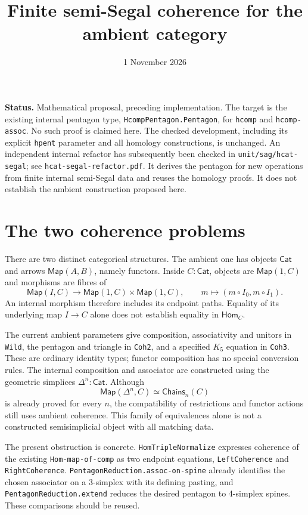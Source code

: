 \documentclass[11pt]{amsart}
\title{Finite semi-Segal coherence for the ambient category}
\date{1 November 2026}
\newcommand{\Cat}{\mathsf{Cat}}
\newcommand{\Map}{\mathsf{Map}}
\newcommand{\Hom}{\mathsf{Hom}}
\newcommand{\code}[1]{\nolinkurl{#1}}
\theoremstyle{definition}
\begin{document}
\maketitle

\noindent
\textbf{Status.} Mathematical proposal, preceding implementation.
The target is the existing internal pentagon type,
\code{HcompPentagon.Pentagon}, for \code{hcomp} and
\code{hcomp-assoc}. No such proof is claimed here.
The checked development, including its explicit \code{hpent} parameter
and all homology constructions, is unchanged.
An independent internal refactor has subsequently been checked in
\code{unit/sag/hcat-segal}; see \code{hcat-segal-refactor.pdf}.
It derives the pentagon for new operations from finite internal
semi-Segal data and reuses the homology proofs. It does not establish
the ambient construction proposed here.

\section{The two coherence problems}

There are two distinct categorical structures. The ambient one has
objects $\Cat$ and arrows $\Map(A,B)$, namely functors. Inside $C:\Cat$,
objects are $\Map(1,C)$ and morphisms are fibres of
\[
 \Map(I,C)\longrightarrow \Map(1,C)\times\Map(1,C),
 \qquad m\longmapsto(m\circ I_0,m\circ I_1).
\]
An internal morphism therefore includes its endpoint paths. Equality of
its underlying map $I\to C$ alone does not establish equality in $\Hom_C$.

The current ambient parameters give composition, associativity and
unitors in \code{Wild}, the pentagon and triangle in \code{Coh2}, and
a specified $K_5$ equation in \code{Coh3}. These are ordinary identity
types; functor composition has no special conversion rules.
The internal composition and associator are constructed using the
geometric simplices $\Delta^n:\Cat$. Although
\[
 \Map(\Delta^n,C)\simeq\mathsf{Chains}_n(C)
\]
is already proved for every $n$, the compatibility of restrictions and
functor actions still uses ambient coherence. This family of equivalences
alone is not a constructed semisimplicial object with all matching data.

The present obstruction is concrete.
\code{HomTripleNormalize} expresses coherence of the existing
\code{Hom-map-of-comp} as two endpoint equations,
\code{LeftCoherence} and \code{RightCoherence}.
\code{PentagonReduction.assoc-on-spine} already identifies the chosen
associator on a 3-simplex with its defining pasting, and
\code{PentagonReduction.extend} reduces the desired pentagon to
4-simplex spines. These comparisons should be reused.
\end{document}
